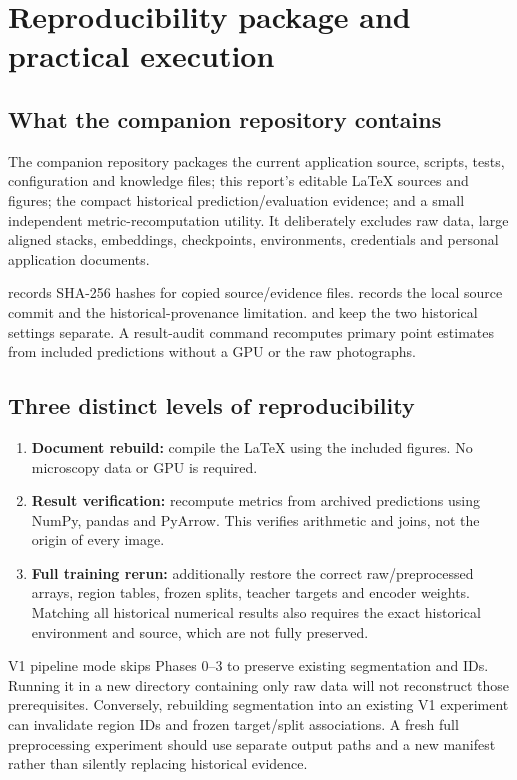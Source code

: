 \section{Reproducibility package and practical execution}
\subsection{What the companion repository contains}
The companion repository packages the current application source, scripts, tests, configuration and knowledge files; this report's editable LaTeX sources and figures; the compact historical prediction/evaluation evidence; and a small independent metric-recomputation utility. It deliberately excludes raw data, large aligned stacks, embeddings, checkpoints, environments, credentials and personal application documents.

 records SHA-256 hashes for copied source/evidence files.  records the local source commit and the historical-provenance limitation.  and  keep the two historical settings separate. A result-audit command recomputes primary point estimates from included predictions without a GPU or the raw photographs.

\subsection{Three distinct levels of reproducibility}
\begin{enumerate}
\item \textbf{Document rebuild:} compile the LaTeX using the included figures. No microscopy data or GPU is required.
\item \textbf{Result verification:} recompute metrics from archived predictions using NumPy, pandas and PyArrow. This verifies arithmetic and joins, not the origin of every image.
\item \textbf{Full training rerun:} additionally restore the correct raw/preprocessed arrays, region tables, frozen splits, teacher targets and encoder weights. Matching all historical numerical results also requires the exact historical environment and source, which are not fully preserved.
\end{enumerate}

V1 pipeline mode skips Phases 0--3 to preserve existing segmentation and IDs. Running it in a new directory containing only raw data will not reconstruct those prerequisites. Conversely, rebuilding segmentation into an existing V1 experiment can invalidate region IDs and frozen target/split associations. A fresh full preprocessing experiment should use separate output paths and a new manifest rather than silently replacing historical evidence.

